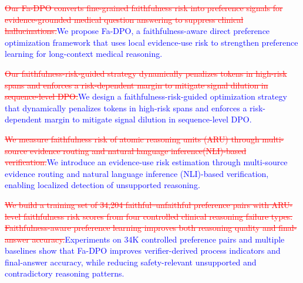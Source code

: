 \documentclass[a4paper,fleqn,doubleblind]{cas-sc}
\DeclareRobustCommand{\deleted}[1]{\textcolor{red}{\sout{#1}}}
\DeclareRobustCommand{\added}[1]{\textcolor{blue}{#1}}
\begin{document}
\begin{abstract}
\added{Experiments on 34,204 controlled preference pairs across six 8B backbones show that Fa-DPO improves automatic same-answer process metrics (+5.1 Support Rate; -7.4 Unsupported Medical Reasoning Rate; -5.6 Reasoning--Answer Inconsistency Rate) and yields observed downstream MQA macro-average accuracy gains of 1.2--1.6 percentage points over retained-pair standard DPO. These process-metric gains are interpreted as diagnostic evidence, while the benchmark results separately support final-answer accuracy improvements.}
\end{abstract}

\begin{highlights}
\item \deleted{Our Fa-DPO converts fine-grained faithfulness risk into preference signals for evidence-grounded medical question answering to suppress clinical hallucinations.}\added{We propose Fa-DPO, a faithfulness-aware direct preference optimization framework that uses local evidence-use risk to strengthen preference learning for long-context medical reasoning.}
\item \deleted{Our faithfulness-risk-guided strategy dynamically penalizes tokens in high-risk spans and enforces a risk-dependent margin to mitigate signal dilution in sequence-level DPO.}\added{We design a faithfulness-risk-guided optimization strategy that dynamically penalizes tokens in high-risk spans and enforces a risk-dependent margin to mitigate signal dilution in sequence-level DPO.}
\item \deleted{We measure faithfulness risk of atomic reasoning units (ARU) through multi-source evidence routing and natural language inference(NLI)-based verification.}\added{We introduce an evidence-use risk estimation through multi-source evidence routing and natural language inference (NLI)-based verification, enabling localized detection of unsupported reasoning.}
\item \deleted{We build a training set of 34,204 faithful--unfaithful preference pairs with ARU-level faithfulness risk scores from four controlled clinical reasoning failure types. Faithfulness-aware preference learning improves both reasoning quality and final-answer accuracy.}\added{Experiments on 34K controlled preference pairs and multiple baselines show that Fa-DPO improves verifier-derived process indicators and final-answer accuracy, while reducing safety-relevant unsupported and contradictory reasoning patterns.}
\end{highlights}
\end{document}
